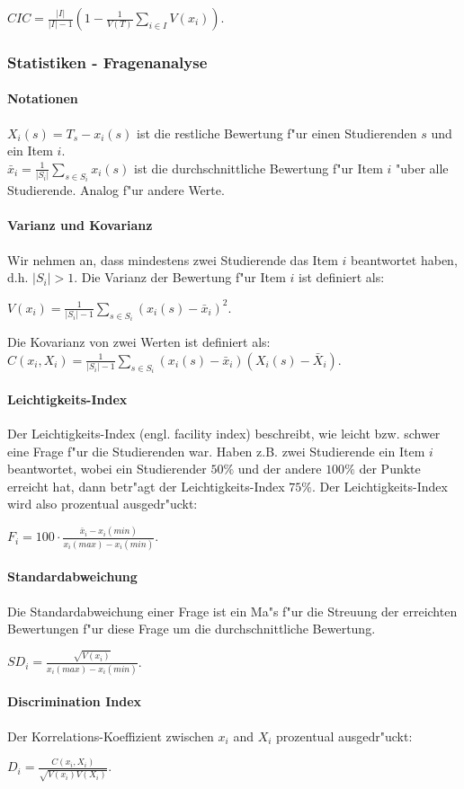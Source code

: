\documentclass[12pt]{report}
\begin{document}
$CIC=\frac{|I|}{|I|-1}\left(1-\frac{1}{V(T)}\sum\limits_{i\in I}V(x_i)\right)$.


\subsubsection{Statistiken - Fragenanalyse}
\paragraph{Notationen}

$X_i(s) = T_s - x_i(s)$ ist die restliche Bewertung f"ur einen Studierenden $s$ und ein Item $i$.\\
$\bar{x}_i = \frac{1}{|S_i|}\sum\limits_{s\in S_i}x_i(s)$ ist die durchschnittliche Bewertung f"ur Item $i$ "uber alle Studierende. Analog f"ur andere Werte.

\paragraph{Varianz und Kovarianz}

Wir nehmen an, dass mindestens zwei Studierende das Item $i$ beantwortet haben, d.h. $|S_i| > 1$.
Die Varianz der Bewertung f"ur Item $i$ ist definiert als:

 $V(x_i) = \frac{1}{|S_i| - 1}\sum\limits_{s\in S_i} (x_i(s) - \bar{x}_i)^2$.

\noindent Die Kovarianz von zwei Werten ist definiert als:\\
$C(x_i, X_i) = \frac{1}{|S_i| - 1}\sum\limits_{s\in S_i}(x_i(s) - \bar{x}_i)(X_i(s) - \bar{X}_i)$.


\paragraph{Leichtigkeits-Index}
Der Leichtigkeits-Index (engl. facility index) beschreibt, wie leicht bzw. schwer eine Frage f"ur die Studierenden war. 
Haben z.B. zwei Studierende ein Item $i$ beantwortet, wobei ein Studierender $50\%$ und der andere $100\%$ der Punkte erreicht hat, dann betr"agt der Leichtigkeits-Index $75\%$. Der Leichtigkeits-Index wird also prozentual ausgedr"uckt:

$F_i = 100\cdot\frac{\bar{x}_i - x_i(min)}{x_i(max) - x_i(min)}$. 

\paragraph{Standardabweichung}
Die Standardabweichung einer Frage ist ein Ma"s f"ur die Streuung der erreichten Bewertungen f"ur diese Frage um die durchschnittliche Bewertung. 

$SD_i = \frac{\sqrt{V(x_i)}}{x_i(max) - x_i(min)}$.

\paragraph{Discrimination Index}
Der Korrelations-Koeffizient zwischen $x_i$ and $X_i$ prozentual ausgedr"uckt:

$D_i= \frac{C(x_i, X_i)}{\sqrt{V(x_i)V(X_i)}}$.

\ \\
\end{document}
